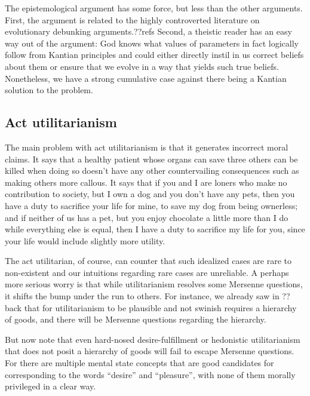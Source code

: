 The epistemological argument has some force, but less than the other arguments. First, the argument is related to the highly controverted
literature on evolutionary debunking arguments.??refs Second, a theistic reader has an easy way out of the argument:
God knows what values of parameters in fact logically follow from Kantian principles and could either directly instil in
us correct beliefs about them or ensure that we evolve in a way that yields such true beliefs. Nonetheless, we have
a strong cumulative case against there being a Kantian solution to the problem.

\subsection{Act utilitarianism}
The main problem with act utilitarianism is that it generates incorrect moral claims. It says that a healthy patient
whose organs can save three others can be killed when doing so doesn't have any other countervailing consequences such
as making others more callous. It says that if you and I are loners who make no contribution to society, but I own
a dog and you don't have any pets, then you have a duty to sacrifice your life for mine, to save my dog from being
ownerless; and if neither of us has a pet, but you enjoy chocolate a little more than I do while everything else is
equal, then I have a duty to sacrifice my life for you, since your life would include slightly more utility.

The act utilitarian, of course, can counter that such idealized cases are rare to non-existent and our intuitions
regarding rare cases are unreliable. A perhaps more serious worry is that while utilitarianism resolves some
Mersenne questions, it shifts the bump under the run to others. For instance, we already saw in ??back that for utilitarianism to be plausible and not swinish requires a hierarchy of goods,
and there will be Mersenne questions regarding the hierarchy.

But now note that even hard-nosed desire-fulfillment or hedonistic utilitarianism that does not posit a hierarchy
of goods will fail to escape Mersenne
questions. For there are multiple mental state concepts that are good candidates for corresponding to the words ``desire'' and ``pleasure'', with none of them morally privileged in a clear way.

